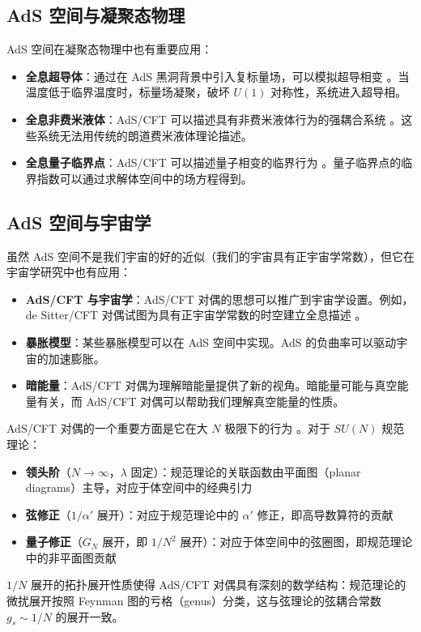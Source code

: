 \subsection{AdS 空间与凝聚态物理}

AdS 空间在凝聚态物理中也有重要应用：
\begin{itemize}
    \item \textbf{全息超导体}：通过在 AdS 黑洞背景中引入复标量场，可以模拟超导相变 \cite{Hartnoll2007}。当温度低于临界温度时，标量场凝聚，破坏 $U(1)$ 对称性，系统进入超导相。
    \item \textbf{全息非费米液体}：AdS/CFT 可以描述具有非费米液体行为的强耦合系统 \cite{Liu2006}。这些系统无法用传统的朗道费米液体理论描述。
    \item \textbf{全息量子临界点}：AdS/CFT 可以描述量子相变的临界行为 \cite{Hartnoll2009}。量子临界点的临界指数可以通过求解体空间中的场方程得到。
\end{itemize}

\subsection{AdS 空间与宇宙学}

虽然 AdS 空间不是我们宇宙的好的近似（我们的宇宙具有正宇宙学常数），但它在宇宙学研究中也有应用：
\begin{itemize}
    \item \textbf{AdS/CFT 与宇宙学}：AdS/CFT 对偶的思想可以推广到宇宙学设置。例如，de Sitter/CFT 对偶试图为具有正宇宙学常数的时空建立全息描述 \cite{Maldacena1998}。
    \item \textbf{暴胀模型}：某些暴胀模型可以在 AdS 空间中实现。AdS 的负曲率可以驱动宇宙的加速膨胀。
    \item \textbf{暗能量}：AdS/CFT 对偶为理解暗能量提供了新的视角。暗能量可能与真空能量有关，而 AdS/CFT 对偶可以帮助我们理解真空能量的性质。
\end{itemize}

\begin{remark}
AdS/CFT 对偶的一个重要方面是它在大 $N$ 极限下的行为 \cite{Aharony1999}。对于 $SU(N)$ 规范理论：
\begin{itemize}
    \item \textbf{领头阶}（$N \to \infty$，$\lambda$ 固定）：规范理论的关联函数由平面图（planar diagrams）主导，对应于体空间中的经典引力
    \item \textbf{弦修正}（$1/\alpha'$ 展开）：对应于规范理论中的 $\alpha'$ 修正，即高导数算符的贡献
    \item \textbf{量子修正}（$G_N$ 展开，即 $1/N^2$ 展开）：对应于体空间中的弦圈图，即规范理论中的非平面图贡献
\end{itemize}
$1/N$ 展开的拓扑展开性质使得 AdS/CFT 对偶具有深刻的数学结构：规范理论的微扰展开按照 Feynman 图的亏格（genus）分类，这与弦理论的弦耦合常数 $g_s \sim 1/N$ 的展开一致。
\end{remark}

